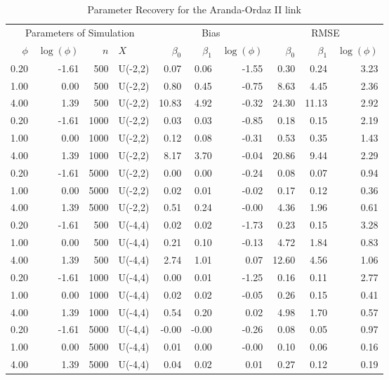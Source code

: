 \documentclass[a4paper,10 pt]{article}
\begin{document}
\begin{table}[ht]
\begin{center}
\caption{Parameter Recovery for the Aranda-Ordaz II link}
\label{ao2table}
\begin{tabular}{rrrlrrrrrr}
  \toprule
\multicolumn{4}{c}{Parameters of Simulation} & 	\multicolumn{3}{c}{Bias} & \multicolumn{3}{c}{RMSE} \\ \cmidrule(r){1-4} \cmidrule(rl){5-7} \cmidrule(l){8-10}  

$\phi$ & $\log(\phi)$ & $n$ & $X$ & $  \beta_0$ &   $\beta_1$ &   $\log(\phi)$ & $   \beta_0$ &    $\beta_1$ &    $\log(\phi)$ \\ 
  \midrule
0.20 & -1.61 & 500 & U(-2,2) & 0.07 & 0.06 & -1.55 & 0.30 & 0.24 & 3.23 \\ 
  1.00 & 0.00 & 500 & U(-2,2) & 0.80 & 0.45 & -0.75 & 8.63 & 4.45 & 2.36 \\ 
  4.00 & 1.39 & 500 & U(-2,2) & 10.83 & 4.92 & -0.32 & 24.30 & 11.13 & 2.92 \\ 
  0.20 & -1.61 & 1000 & U(-2,2) & 0.03 & 0.03 & -0.85 & 0.18 & 0.15 & 2.19 \\ 
  1.00 & 0.00 & 1000 & U(-2,2) & 0.12 & 0.08 & -0.31 & 0.53 & 0.35 & 1.43 \\ 
  4.00 & 1.39 & 1000 & U(-2,2) & 8.17 & 3.70 & -0.04 & 20.86 & 9.44 & 2.29 \\ 
  0.20 & -1.61 & 5000 & U(-2,2) & 0.00 & 0.00 & -0.24 & 0.08 & 0.07 & 0.94 \\ 
  1.00 & 0.00 & 5000 & U(-2,2) & 0.02 & 0.01 & -0.02 & 0.17 & 0.12 & 0.36 \\ 
  4.00 & 1.39 & 5000 & U(-2,2) & 0.51 & 0.24 & -0.00 & 4.36 & 1.96 & 0.61 \\ 
  0.20 & -1.61 & 500 & U(-4,4) & 0.02 & 0.02 & -1.73 & 0.23 & 0.15 & 3.28 \\ 
  1.00 & 0.00 & 500 & U(-4,4) & 0.21 & 0.10 & -0.13 & 4.72 & 1.84 & 0.83 \\ 
  4.00 & 1.39 & 500 & U(-4,4) & 2.74 & 1.01 & 0.07 & 12.60 & 4.56 & 1.06 \\ 
  0.20 & -1.61 & 1000 & U(-4,4) & 0.00 & 0.01 & -1.25 & 0.16 & 0.11 & 2.77 \\ 
  1.00 & 0.00 & 1000 & U(-4,4) & 0.02 & 0.02 & -0.05 & 0.26 & 0.15 & 0.41 \\ 
  4.00 & 1.39 & 1000 & U(-4,4) & 0.54 & 0.20 & 0.02 & 4.98 & 1.70 & 0.57 \\ 
  0.20 & -1.61 & 5000 & U(-4,4) & -0.00 & -0.00 & -0.26 & 0.08 & 0.05 & 0.97 \\ 
  1.00 & 0.00 & 5000 & U(-4,4) & 0.01 & 0.00 & -0.00 & 0.10 & 0.06 & 0.16 \\ 
  4.00 & 1.39 & 5000 & U(-4,4) & 0.04 & 0.02 & 0.01 & 0.27 & 0.12 & 0.19 \\ 
   \bottomrule
\end{tabular}
\end{center}
\end{table}
\end{document}
